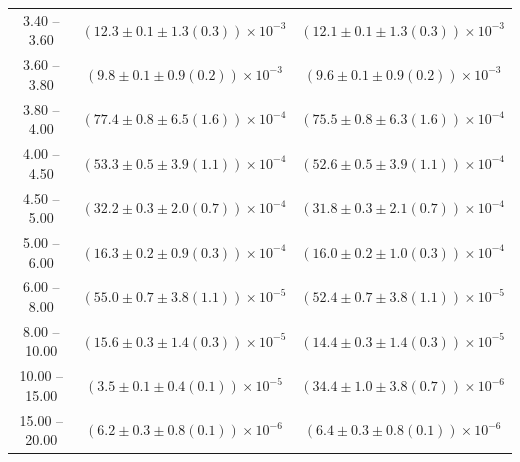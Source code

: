 \begin{table}
\begin{center}
\begin{tabular}{ c | c c }
3.40 -- 3.60 & $(12.3\pm0.1\pm1.3(0.3))\times10^{-3}$ & $(12.1\pm0.1\pm1.3(0.3))\times10^{-3}$ \\ 
3.60 -- 3.80 & $(9.8\pm0.1\pm0.9(0.2))\times10^{-3}$ & $(9.6\pm0.1\pm0.9(0.2))\times10^{-3}$ \\ 
3.80 -- 4.00 & $(77.4\pm0.8\pm6.5(1.6))\times10^{-4}$ & $(75.5\pm0.8\pm6.3(1.6))\times10^{-4}$ \\ 
4.00 -- 4.50 & $(53.3\pm0.5\pm3.9(1.1))\times10^{-4}$ & $(52.6\pm0.5\pm3.9(1.1))\times10^{-4}$ \\ 
4.50 -- 5.00 & $(32.2\pm0.3\pm2.0(0.7))\times10^{-4}$ & $(31.8\pm0.3\pm2.1(0.7))\times10^{-4}$ \\ 
5.00 -- 6.00 & $(16.3\pm0.2\pm0.9(0.3))\times10^{-4}$ & $(16.0\pm0.2\pm1.0(0.3))\times10^{-4}$ \\ 
6.00 -- 8.00 & $(55.0\pm0.7\pm3.8(1.1))\times10^{-5}$ & $(52.4\pm0.7\pm3.8(1.1))\times10^{-5}$ \\ 
8.00 -- 10.00 & $(15.6\pm0.3\pm1.4(0.3))\times10^{-5}$ & $(14.4\pm0.3\pm1.4(0.3))\times10^{-5}$ \\ 
10.00 -- 15.00 & $(3.5\pm0.1\pm0.4(0.1))\times10^{-5}$ & $(34.4\pm1.0\pm3.8(0.7))\times10^{-6}$ \\ 
15.00 -- 20.00 & $(6.2\pm0.3\pm0.8(0.1))\times10^{-6}$ & $(6.4\pm0.3\pm0.8(0.1))\times10^{-6}$ \\ 
\hline
\end{tabular}
\end{center}
\end{table}
 
